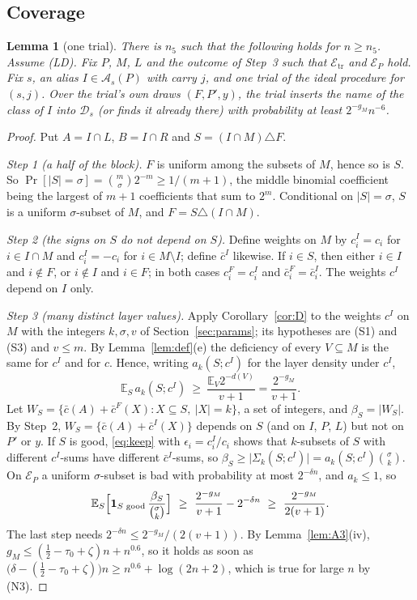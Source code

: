 \documentclass[11pt]{article}
\newtheorem{lemma}{Lemma}[section]
\theoremstyle{definition}
\newcommand{\E}{\mathbb E}
\newcommand{\bc}{\bar c}
\newcommand{\abs}[1]{\lvert #1\rvert}
\newcommand{\cE}{\mathcal E}
\newcommand{\cA}{\mathcal A}
\newcommand{\cD}{\mathcal D}
\begin{document}
\subsection{Coverage}
\begin{lemma}[one trial]\label{lem:A5}
There is $n_5$ such that the following holds for $n\ge n_5$. Assume \textup{(LD)}. Fix $P$, $M$, $L$ and the
outcome of Step~3 such that $\cE_{\mathrm{tr}}$ and $\cE_P$ hold. Fix $s$, an alias $I\in\cA_s(P)$ with carry $j$, and
one trial of the ideal procedure for $(s,j)$. Over the trial's own draws $(F,P',y)$, the trial inserts the name of
the class of $I$ into $\cD_s$ (or finds it already there) with probability at least $2^{-g_M}n^{-6}$.
\end{lemma}
\begin{proof}
Put $A=I\cap L$, $B=I\cap R$ and $S=(I\cap M)\triangle F$.

\emph{Step 1 (a half of the block).} $F$ is uniform among the subsets of $M$, hence so is $S$. So
$\Pr[\abs S=\sigma]=\binom m\sigma2^{-m}\ge1/(m+1)$, the middle binomial coefficient being the largest of $m+1$
coefficients that sum to $2^m$. Conditional on $\abs S=\sigma$, $S$ is a uniform $\sigma$-subset of $M$, and
$F=S\triangle(I\cap M)$.

\emph{Step 2 (the signs on $S$ do not depend on $S$).} Define weights on $M$ by $c^I_i=c_i$ for $i\in I\cap M$ and
$c^I_i=-c_i$ for $i\in M\setminus I$; define $\bc^I$ likewise. If $i\in S$, then either $i\in I$ and $i\notin F$, or
$i\notin I$ and $i\in F$; in both cases $c^F_i=c^I_i$ and $\bc^F_i=\bc^I_i$. The weights $c^I$ depend on $I$ only.

\emph{Step 3 (many distinct layer values).} Apply Corollary~\ref{cor:D} to the weights $c^I$ on $M$ with the
integers $k,\sigma,v$ of Section~\ref{sec:params}; its hypotheses are \textup{(S1)} and \textup{(S3)} and
$v\le m$. By Lemma~\ref{lem:def}(e) the deficiency of every $V\subseteq M$ is the same for $c^I$ and for $c$. Hence,
writing $a_k(S;c^I)$ for the layer density under $c^I$,
\[
 \E_S\,a_k(S;c^I)\ \ge\ \frac{\E_V2^{-d(V)}}{v+1}=\frac{2^{-g_M}}{v+1}.
\]
Let $W_S=\{\bc(A)+\bc^F(X):X\subseteq S,\ \abs X=k\}$, a set of integers, and $\beta_S=\abs{W_S}$. By Step~2,
$W_S=\{\bc(A)+\bc^I(X)\}$ depends on $S$ (and on $I$, $P$, $L$) but not on $P'$ or $y$. If $S$ is good,
\eqref{eq:keep} with $\epsilon_i=c^I_i/c_i$ shows that $k$-subsets of $S$ with different $c^I$-sums have different
$\bc^I$-sums, so $\beta_S\ge\abs{\Sigma_k(S;c^I)}=a_k(S;c^I)\binom\sigma k$. On $\cE_P$ a uniform $\sigma$-subset is
bad with probability at most $2^{-\delta n}$, and $a_k\le1$, so
\[
 \E_S\Bigl[\mathbf 1_{S\text{ good}}\,\frac{\beta_S}{\binom\sigma k}\Bigr]\ \ge\ \frac{2^{-g_M}}{v+1}-2^{-\delta n}
 \ \ge\ \frac{2^{-g_M}}{2(v+1)} .
\]
The last step needs $2^{-\delta n}\le2^{-g_M}/(2(v+1))$. By Lemma~\ref{lem:A3}(iv),
$g_M\le(\tfrac12-\tau_0+\zeta)n+n^{0.6}$, so it holds as soon as
$\bigl(\delta-(\tfrac12-\tau_0+\zeta)\bigr)n\ge n^{0.6}+\log(2n+2)$, which is true for large $n$ by \textup{(N3)}.


\end{proof}
\end{document}
